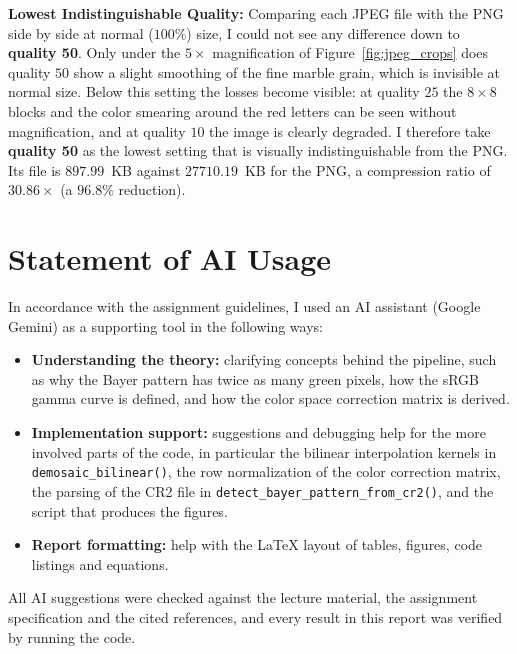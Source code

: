 \documentclass[a4paper]{article}
\begin{document}
\textbf{Lowest Indistinguishable Quality:} Comparing each JPEG file with the PNG side by side at normal ($100\%$) size, I could not see any difference down to \textbf{quality 50}. Only under the $5\times$ magnification of Figure~\ref{fig:jpeg_crops} does quality $50$ show a slight smoothing of the fine marble grain, which is invisible at normal size. Below this setting the losses become visible: at quality $25$ the $8 \times 8$ blocks and the color smearing around the red letters can be seen without magnification, and at quality $10$ the image is clearly degraded. I therefore take \textbf{quality 50} as the lowest setting that is visually indistinguishable from the PNG. Its file is $897.99$~KB against $27710.19$~KB for the PNG, a compression ratio of $30.86\times$ (a $96.8\%$ reduction).

\section{Statement of AI Usage}
In accordance with the assignment guidelines, I used an AI assistant (Google Gemini) as a supporting tool in the following ways:
\begin{itemize}
    \item \textbf{Understanding the theory:} clarifying concepts behind the pipeline, such as why the Bayer pattern has twice as many green pixels, how the sRGB gamma curve is defined, and how the color space correction matrix is derived.
    \item \textbf{Implementation support:} suggestions and debugging help for the more involved parts of the code, in particular the bilinear interpolation kernels in \texttt{demosaic\_bilinear()}, the row normalization of the color correction matrix, the parsing of the CR2 file in \texttt{detect\_bayer\_pattern\_from\_cr2()}, and the script that produces the figures.
    \item \textbf{Report formatting:} help with the \LaTeX{} layout of tables, figures, code listings and equations.
\end{itemize}
All AI suggestions were checked against the lecture material, the assignment specification and the cited references, and every result in this report was verified by running the code.



\end{document}
